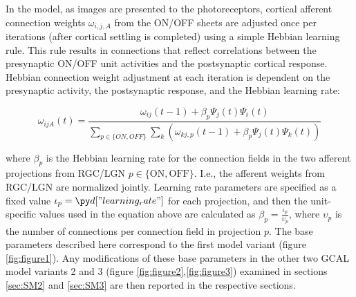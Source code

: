 \documentclass[utf8]{frontiersSCNS}
\begin{document}
In the model, as images are presented to the photoreceptors, cortical afferent connection weights $\omega_{i,j,A}$ from the ON/OFF sheets are adjusted once per iterations (after cortical settling is completed) using a simple Hebbian learning rule. This rule results in connections that reflect correlations between the presynaptic ON/OFF unit activities and the postsynaptic cortical response. Hebbian connection weight adjustment at each iteration is dependent on the presynaptic activity, the postsynaptic response, and the Hebbian learning rate:

\begin{equation}
\omega_{ijA}(t)=\frac{\omega_{ij}(t-1)+\beta_{p}\Psi_{j}(t)\Psi_{i}(t)}{\sum_{p \in \{ON,OFF\}}\sum_{k}\left(\omega_{kj,p}(t-1)+\beta_{p}\Psi_{j}(t)\Psi_{k}(t)\right)}
\end{equation}

\noindent where $\beta_{p}$ is the Hebbian learning rate for the connection fields in the two afferent projections from RGC/LGN $p \in \{\mathrm{ON},\mathrm{OFF}\}$. I.e., the afferent weights from RGC/LGN are normalized jointly.  Learning rate parameters are specified as
a fixed value $\iota_{p}=\insval{learning_rate}$ for each projection, and then the unit-specific values used in the equation above are calculated as
$\beta_{p}=\frac{\iota_{p}}{\upsilon_{p}}$, where $\upsilon_{p}$ is the number of connections per connection field in projection $p$.  
The base parameters described here correspond to the first model variant (figure \ref{fig:figure1}). Any modifications of these base parameters in the other two GCAL model variants 2 and 3 (figure \ref{fig:figure2},\ref{fig:figure3}) examined in 
sections \ref{sec:SM2} and \ref{sec:SM3} are then reported in the respective sections.
\end{document}
